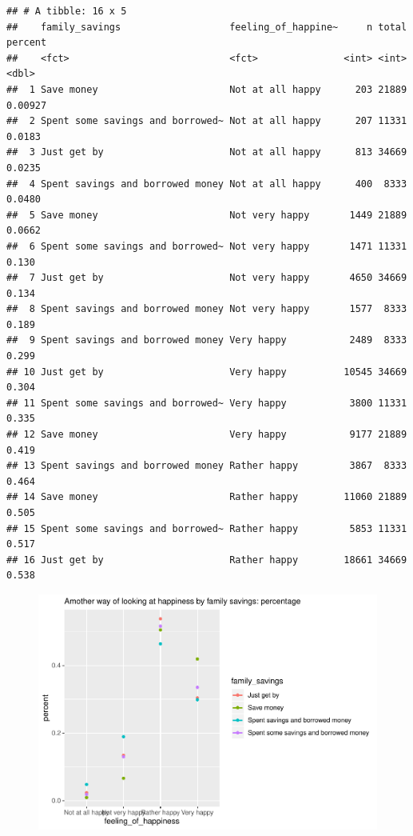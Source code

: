 \documentclass[man]{apa6}
\begin{document}
\begin{verbatim}
## # A tibble: 16 x 5
##    family_savings                   feeling_of_happine~     n total percent
##    <fct>                            <fct>               <int> <int>   <dbl>
##  1 Save money                       Not at all happy      203 21889 0.00927
##  2 Spent some savings and borrowed~ Not at all happy      207 11331 0.0183 
##  3 Just get by                      Not at all happy      813 34669 0.0235 
##  4 Spent savings and borrowed money Not at all happy      400  8333 0.0480 
##  5 Save money                       Not very happy       1449 21889 0.0662 
##  6 Spent some savings and borrowed~ Not very happy       1471 11331 0.130  
##  7 Just get by                      Not very happy       4650 34669 0.134  
##  8 Spent savings and borrowed money Not very happy       1577  8333 0.189  
##  9 Spent savings and borrowed money Very happy           2489  8333 0.299  
## 10 Just get by                      Very happy          10545 34669 0.304  
## 11 Spent some savings and borrowed~ Very happy           3800 11331 0.335  
## 12 Save money                       Very happy           9177 21889 0.419  
## 13 Spent savings and borrowed money Rather happy         3867  8333 0.464  
## 14 Save money                       Rather happy        11060 21889 0.505  
## 15 Spent some savings and borrowed~ Rather happy         5853 11331 0.517  
## 16 Just get by                      Rather happy        18661 34669 0.538
\end{verbatim}

\begin{figure}
\centering
\includegraphics{610_final_files/figure-latex/happiness and family savings JW-3.pdf}
\caption{}
\end{figure}
\end{document}
